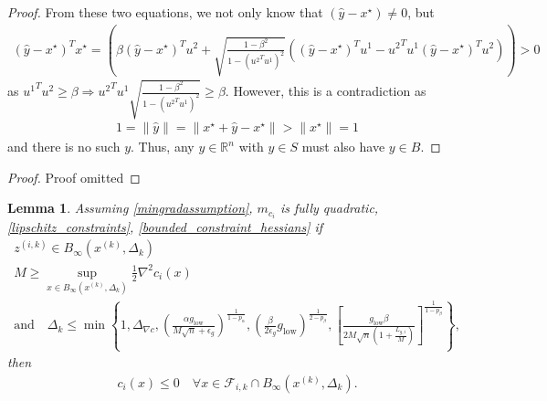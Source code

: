 \documentclass{article}
\newtheorem{lemma}[theorem]{Lemma}
\theoremstyle{case}
\newcommand{\xk}{{x^{(k)}}}
\newcommand{\dk}{\Delta_k}
\newcommand{\fik}{{\mathcal F_{i, k}}}
\newcommand{\rn}{{\mathbb R^{n}}}
\newcommand{\lgi}{{L_{g, i}}}
\newcommand{\tr}{{ B_{\infty}\left(\xk, \dk\right) }}
\newcommand{\mingraddelta}{{\Delta_{\nabla c}}}
\newcommand{\mingrad}{{ g_{\text{low}} }}
\begin{document}
\begin{proof}
From these two equations, we not only know that $\left(\hat y - x^{\star}\right) \ne 0$, but
\begin{align*}
{\left(\hat y - x^{\star}\right)}^Tx^{\star} = 
\left(\beta {\left(\hat y - x^{\star}\right)}^Tu^2 + \sqrt{\frac{1 - \beta^2}{1 - ({u^2}^Tu^1)^2}} \left({\left(\hat y - x^{\star}\right)}^Tu^1 - {u^2}^Tu^1 {\left(\hat y - x^{\star}\right)}^Tu^2 \right)\right) > 0
\end{align*}
as ${u^1}^Tu^2 \ge \beta \Longrightarrow {u^2}^Tu^1\sqrt{\frac{1 - \beta^2}{1 - ({u^2}^Tu^1)^2}} \ge \beta$.
However, this is a contradiction as
\begin{align*}
1 = \|\hat y\| = \|x^{\star} + \hat y - x^{\star}\| > \|x^{\star}\| = 1
\end{align*}
and there is no such $y$.
Thus, any $y \in\rn$ with $y \in S$ must also have $y \in B$.
\end{proof}
\else
\begin{proof}
Proof omitted
\end{proof}
\fi






\begin{lemma}
Assuming
\cref{mingradassumption},
\color{red} $m_{c_i}$ is fully quadratic\color{black}, 
\cref{lipschitz_constraints},
\cref{bounded_constraint_hessians}
if 
\begin{align}
z^{(i, k)} \in \tr \label{z_is_active} \\
M \ge \sup_{x \in \tr} \frac 1 2 \nabla^2 c_i(x) \label{m_bounds} \\
\text{and} \quad \dk \le \min\left\{
1,
\mingraddelta,
\left(\frac{\alpha \mingrad}{M \sqrt{n} + \epsilon_g}\right)^{\frac 1 {1-p_{\alpha}}},
\left(\frac{\beta}{2\epsilon_{g}}\mingrad\right)^{\frac 1 {2 - p_{\beta}}},
\left[\frac {\mingrad  \beta} {2M\sqrt{n}\left(1 + \frac {\lgi} M \right)}\right]^{\frac1 {1 - p_{\beta}} }
\right\}, \label{delta_is_small_enough}
\end{align} then
\begin{align*}
c_i(x) \le 0 \quad \forall x \in \fik \cap \tr.
\end{align*}

\end{lemma}
\end{document}

